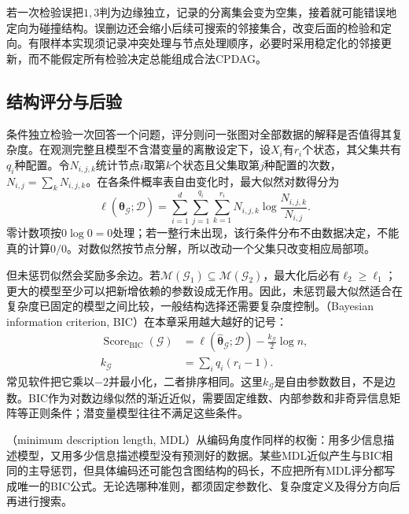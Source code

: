 若一次检验误把$1,3$判为边缘独立，记录的分离集会变为空集，接着就可能错误地定向为碰撞结构。误删边还会缩小后续可搜索的邻接集合，改变后面的检验和定向。有限样本实现须记录冲突处理与节点处理顺序，必要时采用稳定化的邻接更新，而不能假定所有检验决定总能组成合法CPDAG。

\subsection{结构评分与后验}
\label{sec:pgm-structure-learning-scores}

条件独立检验一次回答一个问题，评分则问一张图对全部数据的解释是否值得其复杂度。在观测完整且模型不含潜变量的离散设定下，设$X_i$有$r_i$个状态，其父集共有$q_i$种配置。令$N_{i,j,k}$统计节点$i$取第$k$个状态且父集取第$j$种配置的次数，$N_{i,j}=\sum_kN_{i,j,k}$。在各条件概率表自由变化时，最大似然对数得分为
\begin{equation}
  \ell(\widehat{\bm{\theta}}_{\mathcal{G}};\mathcal{D})
  =\sum_{i=1}^{d}\sum_{j=1}^{q_i}\sum_{k=1}^{r_i}
    N_{i,j,k}\log\frac{N_{i,j,k}}{N_{i,j}}.
  \label{eq:pgm-structure-learning-local-likelihood}
\end{equation}
零计数项按$0\log0=0$处理；若一整行未出现，该行条件分布不由数据决定，不能真的计算$0/0$。对数似然按节点分解，所以改动一个父集只改变相应局部项。

但未惩罚似然会奖励多余边。若$\mathcal{M}(\mathcal{G}_1)\subseteq\mathcal{M}(\mathcal{G}_2)$，最大化后必有$\ell_2\geq\ell_1$；更大的模型至少可以把新增依赖的参数设成无作用。因此，未惩罚最大似然适合在复杂度已固定的模型之间比较，一般结构选择还需要复杂度控制。（Bayesian information criterion, BIC）在本章采用越大越好的记号：
\begin{equation}
  \begin{aligned}
    \operatorname{Score}_{\mathrm{BIC}}(\mathcal{G})
      &=\ell(\widehat{\bm{\theta}}_{\mathcal{G}};\mathcal{D})
        -\frac{k_{\mathcal{G}}}{2}\log n,\\
    k_{\mathcal{G}}&=\sum_iq_i(r_i-1).
  \end{aligned}
  \label{eq:pgm-structure-learning-bic}
\end{equation}
常见软件把它乘以$-2$并最小化，二者排序相同。这里$k_{\mathcal{G}}$是自由参数数目，不是边数。BIC作为对数边缘似然的渐近近似，需要固定维数、内部参数和非奇异信息矩阵等正则条件；潜变量模型往往不满足这些条件。

（minimum description length, MDL）从编码角度作同样的权衡：用多少信息描述模型，又用多少信息描述模型没有预测好的数据。某些MDL近似产生与BIC相同的主导惩罚，但具体编码还可能包含图结构的码长，不应把所有MDL评分都写成唯一的BIC公式。无论选哪种准则，都须固定参数化、复杂度定义及得分方向后再进行搜索。

